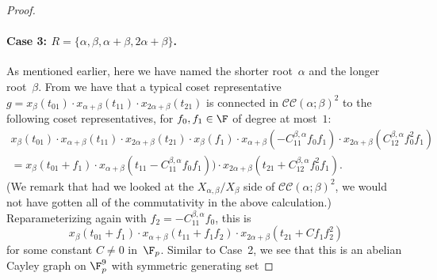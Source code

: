 \documentclass[11pt]{article}
\newcommand{\CC}[2]{\mathcal{C}\mathcal{C}(#1;#2)}
\begin{document}
\begin{proof}
    \paragraph{Case 3: $R = \{\alpha,\beta,\alpha+\beta, 2\alpha+\beta\}$.}  
    As mentioned earlier, here we have named the shorter root~$\alpha$ and the longer root~$\beta$.
    From  we have that a typical coset representative 
    $
        g = x_\beta(t_{01})\cdot x_{\alpha+\beta}(t_{11}) \cdot x_{2\alpha+\beta}(t_{21})
    $
    is connected in $\CC{\alpha}{\beta}^2$ to the following coset representatives, for $f_0, f_1 \in \F$ of degree at most~$1$:
    \begin{multline*}
        x_\beta(t_{01})\cdot x_{\alpha+\beta}(t_{11})\cdot x_{2\alpha+\beta}(t_{21}) \cdot x_{\beta}(f_1) \cdot x_{\alpha+\beta}(-C_{11}^{\beta,\alpha} f_0f_1) \cdot x_{2\alpha+\beta}(C_{12}^{\beta,\alpha} f_0^2f_1) \\
        = x_\beta(t_{01} + f_1)\cdot x_{\alpha+\beta}(t_{11}-C_{11}^{\beta,\alpha} f_0f_1))\cdot x_{2\alpha+\beta}(t_{21}+C_{12}^{\beta,\alpha} f_0^2f_1).
    \end{multline*}
    (We remark that had we looked at the $X_{\alpha,\beta}/X_\beta$ side of $\CC{\alpha}{\beta}^2$, we would not have gotten all of the commutativity in the above calculation.)
    Reparameterizing again with $f_2 = -C_{11}^{\beta,\alpha} f_0$, this is
    \[
        x_\beta(t_{01} + f_1)\cdot x_{\alpha+\beta}(t_{11}+f_1f_2) \cdot x_{2\alpha+\beta}(t_{21}+C f_1f_2^2)
    \]
    for some constant $C \neq 0$ in~$\F_p$.
    Similar to Case~2, we see that this is an abelian Cayley graph on $\F_p^9$ with symmetric generating set

\end{proof}
\end{document}

